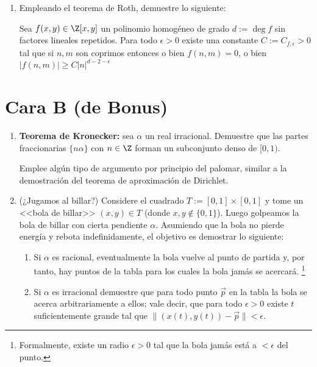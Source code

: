 \documentclass[11pt, reqno]{amsart}
\begin{document}
\begin{enumerate}[resume]
	\item Empleando el teorema de Roth, demuestre lo siguiente:

		Sea $f(x, y) \in \Z[x, y]$ un polinomio homogéneo de grado $d := \deg f$ sin factores lineales repetidos.
		Para todo $\epsilon > 0$ existe una constante $C := C_{f, \epsilon} > 0$ tal que si $n, m$ son coprimos entonces
		o bien $f(n, m) = 0$, o bien $|f(n, m)| \ge C |n|^{d - 2 - \epsilon}$
\end{enumerate}

\section{Cara B (de Bonus)}
\begin{enumerate}[resume]
	\item \textbf{Teorema de Kronecker:} sea $\alpha$ un real irracional.
		Demuestre que las partes fraccionarias $\{ n \alpha \}$ con $n\in\Z$ forman un subconjunto denso de $[0, 1)$.

		\begin{hint}
			Emplee algún tipo de argumento por principio del palomar, similar a la demostración del teorema de aproximación de Dirichlet.
		\end{hint}

	\item \hard
		(¿Jugamos al billar?)
		Considere el cuadrado $T := [0, 1] \times [0, 1]$ y tome un <<bola de billar>> $(x, y) \in T$ (donde $x, y \notin \{ 0, 1 \}$).
		Luego golpeamos la bola de billar con cierta pendiente $\alpha$.
		Asumiendo que la bola no pierde energía y rebota indefinidamente, el objetivo es demostrar lo siguiente:
		\begin{enumerate}
			\item Si $\alpha$ es racional, eventualmente la bola vuelve al punto de partida y, por tanto, hay puntos de la tabla para los cuales
				la bola jamás se acercará.%
				\footnote{Formalmente, existe un radio $\epsilon > 0$ tal que la bola jamás está a $<\epsilon$ del punto.}
			\item Si $\alpha$ es irracional demuestre que para todo punto $\vec p$ en la tabla la bola se acerca arbitrariamente a ellos;
				vale decir, que para todo $\epsilon > 0$ existe $t$ suficientemente grande tal que $\|(x(t), y(t)) - \vec p\| < \epsilon$.
		\end{enumerate}
\end{enumerate}
\end{document}
